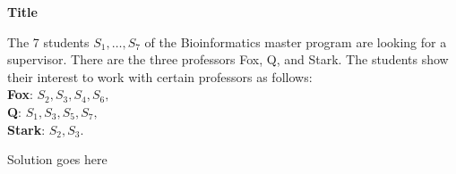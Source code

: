 \question \textbf{Title}

The 7 students $S_1, \dots , S_7$ of the Bioinformatics master program are looking for a supervisor.
There are the three professors Fox, Q, and Stark.
The students show their interest to work with certain professors as follows:\\
\textbf{Fox}: $S_2, S_3, S_4, S_6,$\\
\textbf{Q}: $S_1, S_3, S_5, S_7,$\\
\textbf{Stark}: $S_2, S_3$.\\

\begin{solution}
Solution goes here
\end{solution}